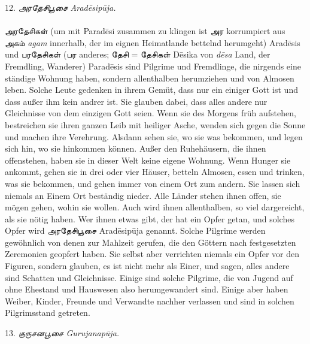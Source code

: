 \documentclass{article}
\newcommand{\TamilText}[1]{\texttamil{#1}}
\newcommand{\tam}[1]{\TamilText{#1}}
\begin{document}
\begin{center}
12. \emph{\tam{அரதேசிபூசை} Arad\={e}sip\={u}ja.}
\end{center}
\paragraph{}
\tam{அரதேசிகள்} (um mit Parad\={e}si zusammen zu klingen ist \tam{அர} korrumpiert aus \tam{அகம்} \emph{agam} innerhalb, der im eignen Heimatlande bettelnd herumgeht) Arad\={e}sis und \tam{பரதேசிகள்} (\tam{பர} anderes; \tam{தேசி} = \tam{தேசிகள்} D\={e}sika von \emph{d\={e}sa} Land, der Fremdling, Wanderer) Parad\={e}sis sind Pilgrime und Fremdlinge, die nirgends eine ständige Wohnung haben, sondern allenthalben herumziehen und von Almosen leben. Solche Leute gedenken in ihrem Gemüt, dass nur ein einiger Gott ist und dass außer ihm kein andrer ist. Sie glauben dabei, dass alles andere nur Gleichnisse von dem einzigen Gott seien. Wenn sie des Morgens früh aufstehen, bestreichen sie ihren ganzen Leib mit heiliger Asche, wenden sich gegen die Sonne und machen ihre Verehrung. Alsdann sehen sie, wo sie was bekommen, und legen sich hin, wo sie hinkommen können. Außer den Ruhehäusern, die ihnen offenstehen, haben sie in dieser Welt keine eigene Wohnung. Wenn Hunger sie ankommt, gehen sie in drei oder vier Häuser, betteln Almosen, essen und trinken, was sie bekommen, und gehen immer von einem Ort zum andern. Sie lassen sich niemals an Einem Ort beständig nieder. Alle Länder stehen ihnen offen, sie mögen gehen, wohin sie wollen. Auch wird ihnen allenthalben, so viel dargereicht, als sie nötig haben. Wer ihnen etwas gibt, der hat ein Opfer getan, und solches Opfer wird \tam{அரதேசிபூசை} Arad\={e}sip\={u}ja genannt. Solche Pilgrime werden gewöhnlich von denen zur Mahlzeit gerufen, die den Göttern nach festgesetzten Zeremonien geopfert haben. Sie selbst aber verrichten niemals ein Opfer vor den Figuren, sondern glauben, es ist nicht mehr als Einer, und sagen, alles andere sind Schatten und Gleichnisse. Einige sind solche Pilgrime, die von Jugend auf ohne Ehestand und Hauswesen also herumgewandert sind. Einige aber haben Weiber, Kinder, Freunde und Verwandte nachher verlassen und sind in solchen Pilgrimsstand getreten.

\begin{center}
13. \emph{\tam{குருசனபூசை} Gurujanap\={u}ja.}
\end{center}
\end{document}
